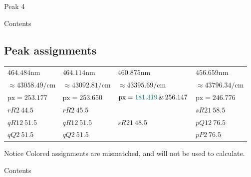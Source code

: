 \documentclass[aspectratio=1610,scheme=plain]{ctexbeamer}
\begin{document}
\begin{frame}{Peak 4}
\begin{figure}[H]
\end{figure}
\end{frame}
\begin{frame}{Contents}
\end{frame}
\subsection{Peak assignments}
\begin{frame}{\insertsubsection}\nocite{pgopher}
			\begin{table}
			\centering  	 
			\scriptsize
			\begin{tabularx}{0.9\textwidth}{llll}    
				\toprule   
				$464.484 \unit{\nano \meter}$ &$464.114\unit{\nano \meter}$&$460.875 \unit{\nano \meter}$& $456.659 \unit{\nano \meter}$\\
				$\approx43058.49 \unit{\per \centi \meter}$ &   $\approx43092.81\unit{\per \centi \meter}$ &  $\approx 43395.69\unit{\per \centi \meter}$ & $\approx 43796.34\unit{\per \centi \meter} $\\
				\midrule   
				$\text{px}=253.177$ & $\text{px}=253.650$ & $\text{px}=\textcolor[RGB]{0,112,127}{181.319}\,\&\,256.147$ &$ \text{px}=246.776$ \\  
				\midrule 
				$rR2\:44.5$ & $rR2\:45.5$ &  &$sR21\:58.5$\\  
				\textcolor[RGB]{0,112,127}{$qR12\:51.5$} & \textcolor[RGB]{0,112,127}{$qR12 \:51.5$} &  $sR21\:48.5$ & \textcolor[RGB]{0,112,127}{$pQ12 \:76.5$} \\ 
				\textcolor[RGB]{0,112,127}{$qQ2\: 51.5$} & \textcolor[RGB]{0,112,127}{$qQ2\: 51.5$} &   & \textcolor[RGB]{0,112,127}{$pP2\: 76.5$} \\ 
				\bottomrule    
			\end{tabularx}%
			\label{tab:addlabel}%
		\end{table}%
		\begin{alertblock}{Notice}
			\textcolor[RGB]{0,112,127}{Colored} assignments are mismatched, and will not be used to calculate.
		\end{alertblock}
	\end{frame}
	\begin{frame}{Contents}
	\end{frame}
\end{document}
